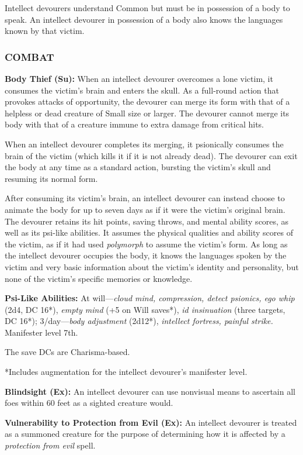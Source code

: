 \documentclass{article}
\begin{document}
Intellect devourers understand Common but must be in possession of a body to speak. 
An intellect devourer in possession of a body also knows the languages known by 
that victim.

\subsubsection*{COMBAT}

\textbf{Body Thief (Su):} When an intellect devourer overcomes a lone victim, it 
consumes the victim's brain and enters the skull. As a full-round action that provokes 
attacks of opportunity, the devourer can merge its form with that of a helpless 
or dead creature of Small size or larger. The devourer cannot merge its body with 
that of a creature immune to extra damage from critical hits.

When an intellect devourer completes its merging, it psionically consumes the brain 
of the victim (which kills it if it is not already dead). The devourer can exit 
the body at any time as a standard action, bursting the victim's skull and resuming 
its normal form.

After consuming its victim's brain, an intellect devourer can instead choose to 
animate the body for up to seven days as if it were the victim's original brain. 
The devourer retains its hit points, saving throws, and mental ability scores, 
as well as its psi-like abilities. It assumes the physical qualities and ability 
scores of the victim, as if it had used \textit{polymorph }to assume the victim's 
form. As long as the intellect devourer occupies the body, it knows the languages 
spoken by the victim and very basic information about the victim's identity and 
personality, but none of the victim's specific memories or knowledge.

\textbf{Psi-Like Abilities:} At will---\textit{cloud mind, compression, detect 
psionics, ego whip }(2d4, DC 16*), \textit{empty mind }(+5 on Will saves*), \textit{id 
insinuation }(three targets, DC 16*); 3/day---\textit{body adjustment }(2d12*), 
\textit{intellect fortress, painful strike. }Manifester level 7th.

The save DCs are Charisma-based.

*Includes augmentation for the intellect devourer's manifester level.

\textbf{Blindsight (Ex): }An intellect devourer can use nonvisual means to ascertain 
all foes within 60 feet as a sighted creature would.

\textbf{Vulnerability to Protection from Evil (Ex):} An intellect devourer is treated 
as a summoned creature for the purpose of determining how it is affected by a \textit{protection 
from evil }spell. 
\end{document}
